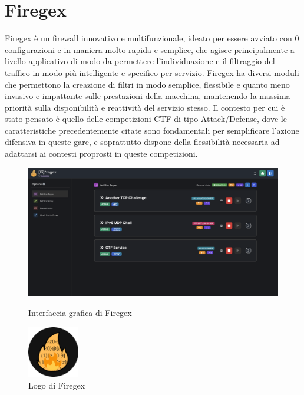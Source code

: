 \chapter{Firegex}


Firegex è un firewall innovativo e multifunzionale, ideato per essere avviato con 0 configurazioni e in maniera molto rapida e semplice, che agisce principalmente a
livello applicativo di modo da permettere l'individuazione e il filtraggio del traffico in modo più intelligente e specifico per servizio.
Firegex ha diversi moduli che permettono la creazione di filtri in modo semplice, flessibile e quanto meno invasivo e impattante sulle prestazioni della macchina,
mantenendo la massima priorità sulla disponibilità e reattività del servizio stesso.
Il contesto per cui è stato pensato è quello delle competizioni CTF di tipo Attack/Defense, dove le caratteristiche precedentemente citate sono fondamentali
per semplificare l'azione difensiva in queste gare, e soprattutto dispone della flessibilità necessaria ad adattarsi ai contesti proprosti in queste competizioni.
\begin{figure}[H]
    \centering
    \begin{minipage}[b]{0.7\textwidth}
        \centering
        \includegraphics[width=1\textwidth]{images/chapter2/Firegex_Screenshot.png}
        \caption{Interfaccia grafica di Firegex}
        \label{fig:firegex_frontend}
    \end{minipage}
    \begin{minipage}[b]{0.7\textwidth}
        \centering
        \includegraphics[width=0.20\textwidth]{images/chapter2/FiregexLogo.png}
        \caption{Logo di Firegex}
        \label{fig:firegex_logo}
    \end{minipage}
\end{figure}


